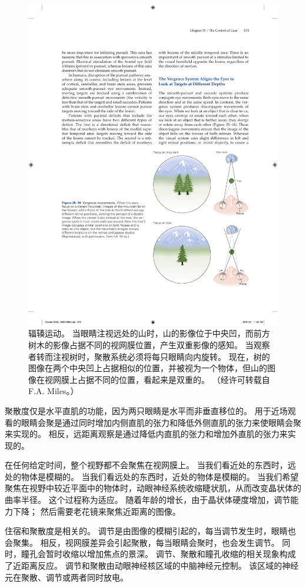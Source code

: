 \begin{figure}[htbp]
	\centering
	\includegraphics[width=0.65\linewidth]{chap35/fig_35_16}
	\caption{辐辏运动。 当眼睛注视远处的山时，山的影像位于中央凹，而前方树木的影像占据不同的视网膜位置，产生双重影像的感知。 当观察者转而注视树时，聚散系统必须将每只眼睛向内旋转。 现在，树的图像在两个中央凹上占据相似的位置，并被视为一个物体，但山的图像在视网膜上占据不同的位置，看起来是双重的。 （经许可转载自 F.A. Miles。）}
	\label{fig:35_16}
\end{figure}

聚散度仅是水平直肌的功能，因为两只眼睛是水平而非垂直移位的。 用于近场观看的眼睛会聚是通过同时增加内侧直肌的张力和降低外侧直肌的张力来使眼睛会聚来实现的。 相反，远距离观察是通过降低内直肌的张力和增加外直肌的张力来实现的。

在任何给定时间，整个视野都不会聚焦在视网膜上。 当我们看近处的东西时，远处的物体是模糊的。 当我们看远处的东西时，近处的物体是模糊的。 当我们希望聚焦在视野中较近平面中的物体时，动眼神经系统收缩睫状肌，从而改变晶状体的曲率半径。 这个过程称为适应。 随着年龄的增长，由于晶状体硬度增加，调节能力下降； 然后需要老花镜来聚焦近距离的图像。

住宿和聚散度是相关的。 调节是由图像的模糊引起的，每当调节发生时，眼睛也会聚集。 相反，视网膜差异会引起聚散，每当眼睛会聚时，也会发生调节。 同时，瞳孔会暂时收缩以增加焦点的景深。 调节、聚散和瞳孔收缩的相关现象构成了近距离反应。 调节和聚散由动眼神经核区域的中脑神经元控制。 该区域的神经元在聚散、调节或两者同时放电。



